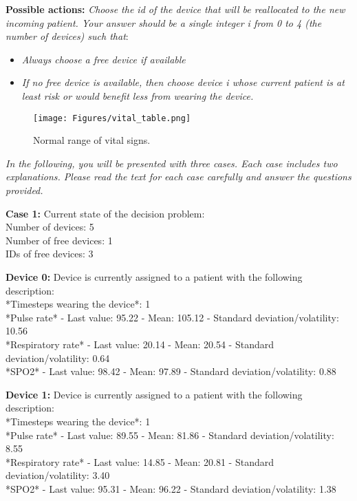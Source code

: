 \textbf{Possible actions:} \emph{Choose the id of the device that will be reallocated to the new incoming patient. Your answer should be a single integer i from 0 to 4 (the number of devices) such that}:
\begin{itemize}
    \item \emph{Always choose a free device if available}
    \item \emph{If no free device is available, then choose device i whose current patient is at least risk or would benefit less from wearing the device.}
\end{itemize}


\begin{figure}[H]
    \centering
    \texttt{[image: Figures/vital\_table.png]}
    \caption{Normal range of vital signs.}
    \label{fig:vital sign}
\end{figure}

\emph{In the following, you will be presented with three cases. Each case includes two explanations. Please read the text for each case carefully and answer the questions provided.} 



\textbf{Case 1:}
Current state of the decision problem: \\
Number of devices: 5 \\
Number of free devices: 1\\
IDs of free devices: 3 


\textbf{Device 0:} Device is currently assigned to a patient with the following description: \\
*Timesteps wearing the device*: 1\\ 
*Pulse rate* - Last value: 95.22 - Mean: 105.12 - Standard deviation/volatility: 10.56 \\
*Respiratory rate* - Last value: 20.14 - Mean: 20.54 - Standard deviation/volatility: 0.64\\
 *SPO2* - Last value: 98.42 - Mean: 97.89 - Standard deviation/volatility: 0.88

\textbf{Device 1:} Device is currently assigned to a patient with the following description:\\ 
*Timesteps wearing the device*: 1\\ 
*Pulse rate* - Last value: 89.55 - Mean: 81.86 - Standard deviation/volatility: 8.55 \\
*Respiratory rate* - Last value: 14.85 - Mean: 20.81 - Standard deviation/volatility: 3.40 \\
*SPO2* - Last value: 95.31 - Mean: 96.22 - Standard deviation/volatility: 1.38 

